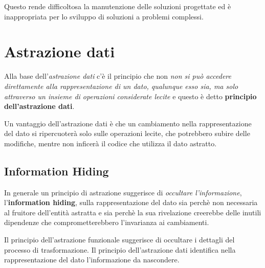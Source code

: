 \documentclass[12pt]{report}
\begin{document}
	Questo rende difficoltosa la manutenzione delle soluzioni progettate ed è inappropriata per lo sviluppo di soluzioni a problemi complessi.
	\section{Astrazione dati}
	Alla base dell'\textit{astrazione dati} c'è il principio che non \textit{non si può accedere direttamente alla rappresentazione di un dato, qualunque esso sia, ma solo attraverso un insieme di operazioni considerate lecite} e questo è detto \textbf{principio dell'astrazione dati}.

	Un vantaggio dell'astrazione dati è che un cambiamento nella rappresentazione del dato si ripercuoterà solo sulle operazioni lecite, che potrebbero subire delle modifiche, mentre non inficerà il codice che utilizza il dato astratto.
	\subsection{Information Hiding}
	In generale un principio di astrazione suggerisce di \textit{occultare l'informazione}, l'\textbf{information hiding}, sulla rappresentazione del dato sia perchè non necessaria al fruitore dell'entità astratta e sia perchè la sua rivelazione creerebbe delle inutili dipendenze che comprometterebbero l'invarianza ai cambiamenti.

	Il principio dell'astrazione funzionale suggerisce di occultare i dettagli del processo di trasformazione. Il principio dell'astrazione dati identifica nella rappresentazione del dato l'informazione da nascondere.
\end{document}
